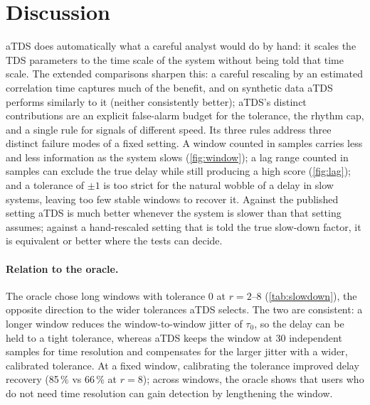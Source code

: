 \documentclass[11pt,a4paper]{article}
\begin{document}
\section{Discussion}
\label{sec:discussion}
aTDS does automatically what a careful analyst would do by hand: it scales the TDS parameters to the time scale of the system without being told that time scale. The extended comparisons sharpen this: a careful rescaling by an estimated correlation time captures much of the benefit, and on synthetic data aTDS performs similarly to it (neither consistently better); aTDS's distinct contributions are an explicit false-alarm budget for the tolerance, the rhythm cap, and a single rule for signals of different speed. Its three rules address three distinct failure modes of a fixed setting. A window counted in samples carries less and less information as the system slows (\cref{fig:window}); a lag range counted in samples can exclude the true delay while still producing a high score (\cref{fig:lag}); and a tolerance of $\pm1$ is too strict for the natural wobble of a delay in slow systems, leaving too few stable windows to recover it. Against the published setting aTDS is much better whenever the system is slower than that setting assumes; against a hand-rescaled setting that is told the true slow-down factor, it is equivalent or better where the tests can decide.

\paragraph{Relation to the oracle.} The oracle chose long windows with tolerance 0 at $r = 2$--8 (\cref{tab:slowdown}), the opposite direction to the wider tolerances aTDS selects. The two are consistent: a longer window reduces the window-to-window jitter of $\tau_0$, so the delay can be held to a tight tolerance, whereas aTDS keeps the window at 30 independent samples for time resolution and compensates for the larger jitter with a wider, calibrated tolerance. At a fixed window, calibrating the tolerance improved delay recovery (85\,\% vs 66\,\% at $r = 8$); across windows, the oracle shows that users who do not need time resolution can gain detection by lengthening the window.
\end{document}
